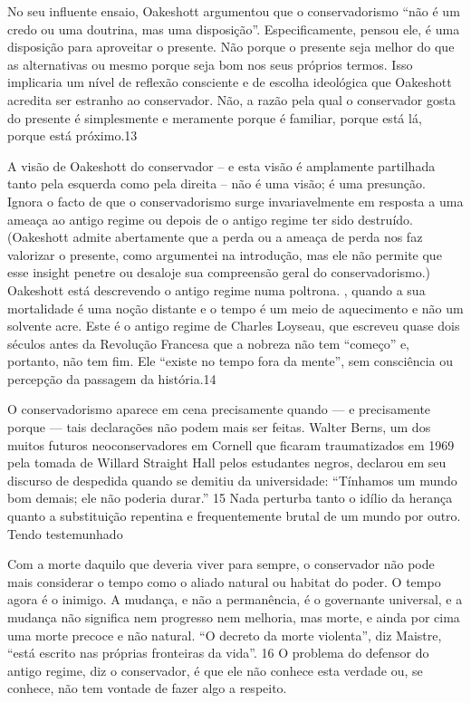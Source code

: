  \par 
No seu influente ensaio, Oakeshott argumentou que o conservadorismo “não é um credo ou uma doutrina, mas uma disposição”. Especificamente, pensou ele, é uma disposição para aproveitar o presente. Não porque o presente seja melhor do que as alternativas ou mesmo porque seja bom nos seus próprios termos. Isso implicaria um nível de reflexão consciente e de escolha ideológica que Oakeshott acredita ser estranho ao conservador. Não, a razão pela qual o conservador gosta do presente é simplesmente e meramente porque é familiar, porque está lá, porque está próximo.{\color{blue}13}
 \par 
A visão de Oakeshott do conservador – e esta visão é amplamente partilhada tanto pela esquerda como pela direita – não é uma visão; é uma presunção. Ignora o facto de que o conservadorismo surge invariavelmente em resposta a uma ameaça ao antigo regime ou depois de o antigo regime ter sido destruído. (Oakeshott admite abertamente que a perda ou a ameaça de perda nos faz valorizar o presente, como argumentei na introdução, mas ele não permite que esse insight penetre ou desaloje sua compreensão geral do conservadorismo.) Oakeshott está descrevendo o antigo regime numa poltrona. , quando a sua mortalidade é uma noção distante e o tempo é um meio de aquecimento e não um solvente acre. Este é o antigo regime de Charles Loyseau, que escreveu quase dois séculos antes da Revolução Francesa que a nobreza não tem “começo” e, portanto, não tem fim. Ele “existe no tempo fora da mente”, sem consciência ou percepção da passagem da história.{\color{blue}14}
 \par 
O conservadorismo aparece em cena precisamente quando — e precisamente porque — tais declarações não podem mais ser feitas. Walter Berns, um dos muitos futuros neoconservadores em Cornell que ficaram traumatizados em 1969 pela tomada de Willard Straight Hall pelos estudantes negros, declarou em seu discurso de despedida quando se demitiu da universidade: “Tínhamos um mundo bom demais; ele não poderia durar.” {\color{blue}15} Nada perturba tanto o idílio da herança quanto a substituição repentina e frequentemente brutal de um mundo por outro. Tendo testemunhado
 \par 
Com a morte daquilo que deveria viver para sempre, o conservador não pode mais considerar o tempo como o aliado natural ou habitat do poder. O tempo agora é o inimigo. A mudança, e não a permanência, é o governante universal, e a mudança não significa nem progresso nem melhoria, mas morte, e ainda por cima uma morte precoce e não natural. “O decreto da morte violenta”, diz Maistre, “está escrito nas próprias fronteiras da vida”. {\color{blue}16} O problema do defensor do antigo regime, diz o conservador, é que ele não conhece esta verdade ou, se conhece, não tem vontade de fazer algo a respeito.
